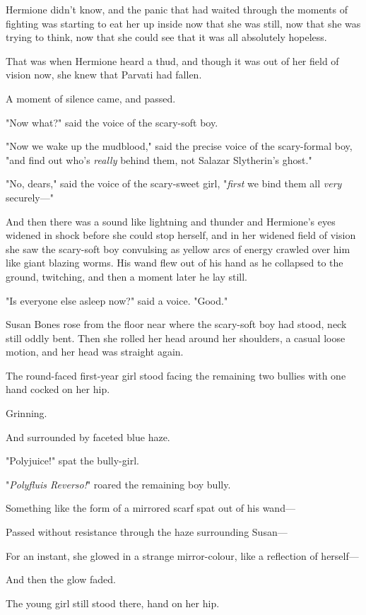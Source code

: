 Hermione didn't know, and the panic that had waited through the moments of
fighting was starting to eat her up inside now that she was still, now that she
was trying to think, now that she could see that it was all absolutely hopeless.

That was when Hermione heard a thud, and though it was out of her field of
vision now, she knew that Parvati had fallen.

A moment of silence came, and passed.

"Now what?" said the voice of the scary-soft boy.

"Now we wake up the mudblood," said the precise voice of the scary-formal boy,
"and find out who's \emph{really} behind them, not Salazar Slytherin's ghost."

"No, dears," said the voice of the scary-sweet girl, "\emph{first} we bind them
all \emph{very} securely---"

And then there was a sound like lightning and thunder and Hermione's eyes
widened in shock before she could stop herself, and in her widened field of
vision she saw the scary-soft boy convulsing as yellow arcs of energy crawled
over him like giant blazing worms. His wand flew out of his hand as he
collapsed to the ground, twitching, and then a moment later he lay still.

"Is everyone else asleep now?" said a voice. "Good."

Susan Bones rose from the floor near where the scary-soft boy had stood, neck
still oddly bent. Then she rolled her head around her shoulders, a casual loose
motion, and her head was straight again.

The round-faced first-year girl stood facing the remaining two bullies with one
hand cocked on her hip.

Grinning.

And surrounded by faceted blue haze.

"Polyjuice!" spat the bully-girl.

"\emph{Polyfluis Reverso!}" roared the remaining boy bully.

Something like the form of a mirrored scarf spat out of his wand---

Passed without resistance through the haze surrounding Susan---

For an instant, she glowed in a strange mirror-colour, like a reflection of
herself---

And then the glow faded.

The young girl still stood there, hand on her hip.

